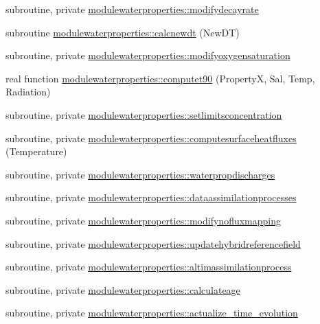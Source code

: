 \begin{DoxyCompactItemize}
\item 
subroutine, private \mbox{\hyperlink{namespacemodulewaterproperties_a5d19c5c0edd1b4706080cd0259456cd8}{modulewaterproperties\+::modifydecayrate}}
\item 
subroutine \mbox{\hyperlink{namespacemodulewaterproperties_a370617430ffb5b34448cfc27deca6c88}{modulewaterproperties\+::calcnewdt}} (New\+DT)
\item 
subroutine, private \mbox{\hyperlink{namespacemodulewaterproperties_a44ca5a1d937416e29607a7effa0209d5}{modulewaterproperties\+::modifyoxygensaturation}}
\item 
real function \mbox{\hyperlink{namespacemodulewaterproperties_a5dbf64b0ab9b6e7fc74c9425dd2e5801}{modulewaterproperties\+::computet90}} (PropertyX, Sal, Temp, Radiation)
\item 
subroutine, private \mbox{\hyperlink{namespacemodulewaterproperties_abf8fd0a88a0f3e9bf66064666c864915}{modulewaterproperties\+::setlimitsconcentration}}
\item 
subroutine, private \mbox{\hyperlink{namespacemodulewaterproperties_a772748e5406dcfadf1087f66a9622a83}{modulewaterproperties\+::computesurfaceheatfluxes}} (Temperature)
\item 
subroutine, private \mbox{\hyperlink{namespacemodulewaterproperties_a1198b9575d74a6939f38dcaa6c63f476}{modulewaterproperties\+::waterpropdischarges}}
\item 
subroutine, private \mbox{\hyperlink{namespacemodulewaterproperties_abdbc309080b92eb5274f0481166c683d}{modulewaterproperties\+::dataassimilationprocesses}}
\item 
subroutine, private \mbox{\hyperlink{namespacemodulewaterproperties_a3d30e149ea4b3528ce74dea8162b347f}{modulewaterproperties\+::modifynofluxmapping}}
\item 
subroutine, private \mbox{\hyperlink{namespacemodulewaterproperties_a352c7f22b34ddac5b3bada0a33cd7221}{modulewaterproperties\+::updatehybridreferencefield}}
\item 
subroutine, private \mbox{\hyperlink{namespacemodulewaterproperties_a372e37e94ca0415d98cc92c58dc4957b}{modulewaterproperties\+::altimassimilationprocess}}
\item 
subroutine, private \mbox{\hyperlink{namespacemodulewaterproperties_a93266e9cb4d7560fc55136ac596e1c35}{modulewaterproperties\+::calculateage}}
\item 
subroutine, private \mbox{\hyperlink{namespacemodulewaterproperties_afcd5345e3a92fad8129c23c999e18873}{modulewaterproperties\+::actualize\+\_\+time\+\_\+evolution}}

\end{DoxyCompactItemize}

